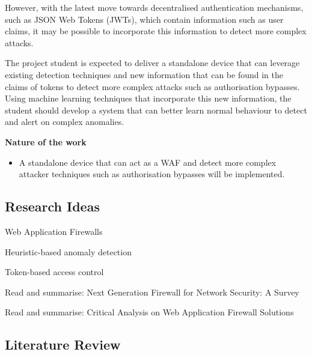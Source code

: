 However, with the latest move towards decentralised authentication mechanisms, such as JSON Web Tokens (JWTs), which contain information such as user claims, it may be possible to incorporate this information to detect more complex attacks.

The project student is expected to deliver a standalone device that can leverage existing detection techniques and new information that can be found in the claims of tokens to detect more complex attacks such as authorisation bypasses. Using machine learning techniques that incorporate this new information, the student should develop a system that can better learn normal behaviour to detect and alert on complex anomalies.

\textbf{Nature of the work}
\begin{itemize}
    \item A standalone device that can act as a WAF and detect more complex attacker techniques such as authorisation bypasses will be implemented.
\end{itemize}

\subsection{Research Ideas}
\begin{compactitem}
\item Web Application Firewalls
\item Heuristic-based anomaly detection
\item Token-based access control
\item Read and summarise: Next Generation Firewall for Network Security: A Survey \cite{8478973}
\item Read and summarise: Critical Analysis on Web Application Firewall Solutions \cite{6513431} 
\end{compactitem}


\subsection{Literature Review}
